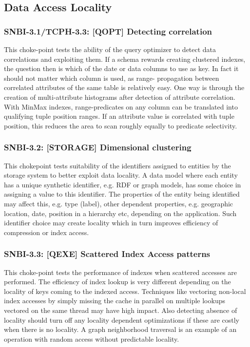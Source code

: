 \subsection{Data Access Locality}

\subsubsection{SNBI-3.1/TCPH-3.3: [QOPT]  Detecting correlation}
\label{choke_point_3.1}
This choke-point tests the ability of the query optimizer to detect data correlations and exploiting them. If a schema rewards creating clustered indexes, the question then is which of the date or data columns to use as key.
In fact it should not matter which column is used, as range- propagation between correlated attributes of the same table is relatively easy. One way is through the creation of multi-attribute histograms after detection of attribute correlation.
With MinMax indexes, range-predicates on any column can be translated into qualifying tuple position ranges. If an attribute value is correlated with tuple position, this reduces the area to scan roughly equally to predicate selectivity.

\subsubsection{SNBI-3.2: [STORAGE] Dimensional clustering}
\label{choke_point_3.2}
This chokepoint tests suitability of the identifiers assigned to entities by the storage system to better exploit data locality. A data model where each entity has a unique synthetic identifier,
e.g. RDF or graph models, has some choice in assigning a value to this identifier. The properties of the entity being identified may affect this, e.g. type (label), other dependent properties,
e.g. geographic location, date, position in a hierarchy etc, depending on the application. Such identifier choice may create locality which in turn improves efficiency of compression or index access.

\subsubsection{SNBI-3.3: [QEXE] Scattered Index Access patterns}
\label{choke_point_3.3}
This choke-point tests the performance of indexes when scattered accesses are performed. The efficiency of index lookup is very different depending on the locality of keys coming to the indexed access.
Techniques like vectoring non-local index accesses by simply missing the cache in parallel on multiple lookups vectored on the same thread may have high impact.
Also detecting absence of locality should turn off any locality dependent optimizations if these are costly when there is no locality. A graph neighborhood traversal is an example of an operation with random access without predictable locality.

